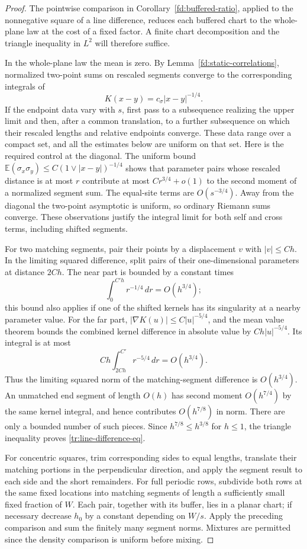 \documentclass[11pt]{article}
\theoremstyle{definition}
\theoremstyle{remark}
\numberwithin{equation}{section}
\begin{document}
\begin{proof}
The pointwise comparison in Corollary~\ref{fd:buffered-ratio}, applied to
the nonnegative square of a line difference, reduces each buffered chart
to the whole-plane law at the cost of a fixed factor. A finite chart
decomposition and the triangle inequality in $L^2$ will therefore suffice.

In the whole-plane law the mean is zero. By
Lemma~\ref{fd:static-correlations}, normalized two-point sums on
rescaled segments converge to the corresponding integrals of
\[
 K(x-y)=c_\sigma |x-y|^{-1/4}.
\]
If the endpoint data vary with $s$, first pass to a subsequence realizing
the upper limit and then, after a common translation, to a further
subsequence on which their rescaled lengths and relative endpoints
converge. These data range over a compact set, and all the estimates
below are uniform on that set.
Here is the required control at the diagonal. The uniform bound
$\mathbb E(\sigma_x\sigma_y)\leq C(1\vee|x-y|)^{-1/4}$ shows that
parameter pairs whose rescaled distance is at most $r$ contribute at
most $Cr^{3/4}+o(1)$ to the second moment of a normalized segment sum.
The equal-site terms are $O(s^{-3/4})$. Away from the diagonal the
two-point asymptotic is uniform, so ordinary Riemann sums converge.
These observations justify the integral limit for both self and cross
terms, including shifted segments.

For two matching segments, pair their points by a displacement $v$ with
$|v|\leq Ch$. In the limiting squared difference, split pairs of their
one-dimensional parameters at distance $2Ch$. The near part is bounded
by a constant times
\[
 \int_0^{C'h} r^{-1/4}\,dr=O(h^{3/4});
\]
this bound also applies if one of the shifted kernels has its singularity
at a nearby parameter value. For the far part,
$|\nabla K(u)|\leq C|u|^{-5/4}$, and the mean value theorem bounds the
combined kernel difference in absolute value by $Ch|u|^{-5/4}$.
Its integral is at most
\[
 Ch\int_{2Ch}^{C'}r^{-5/4}\,dr=O(h^{3/4}).
\]
Thus the limiting squared norm of the matching-segment difference is
$O(h^{3/4})$. An unmatched end segment of length $O(h)$ has second
moment $O(h^{7/4})$ by the same kernel integral, and hence contributes
$O(h^{7/8})$ in norm. There are only a bounded number of such pieces.
Since $h^{7/8}\leq h^{3/8}$ for $h\leq1$, the triangle inequality proves
\eqref{tr:line-difference-eq}.

For concentric squares, trim corresponding sides to equal lengths,
translate their matching portions in the perpendicular direction, and
apply the segment result to each side and the short remainders.
For full periodic rows, subdivide both rows at the same fixed locations
into matching segments of length a sufficiently small fixed fraction of
$W$. Each pair, together with its buffer, lies in a planar chart; if
necessary decrease $h_0$ by a constant depending on $W/s$. Apply the
preceding comparison and sum the finitely many segment norms. Mixtures
are permitted since the density comparison is uniform before mixing.
\end{proof}
\end{document}

